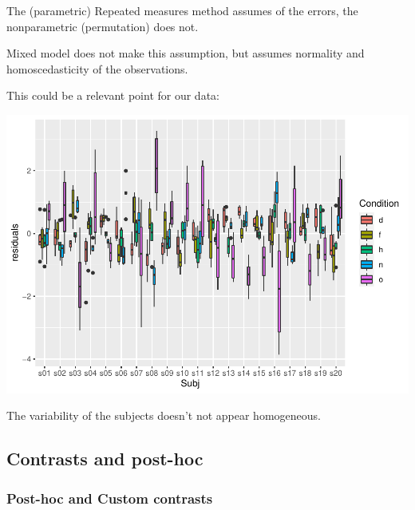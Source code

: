 \documentclass[
]{article}
\newenvironment{Shaded}{\begin{snugshade}}{\end{snugshade}}
\newcommand{\AttributeTok}[1]{\textcolor[rgb]{0.77,0.63,0.00}{#1}}
\newcommand{\FunctionTok}[1]{\textcolor[rgb]{0.00,0.00,0.00}{#1}}
\newcommand{\NormalTok}[1]{#1}
\newcommand{\OtherTok}[1]{\textcolor[rgb]{0.56,0.35,0.01}{#1}}
\newcommand{\SpecialCharTok}[1]{\textcolor[rgb]{0.00,0.00,0.00}{#1}}
\begin{document}
The (parametric) Repeated measures method assumes of the errors, the
nonparametric (permutation) does not.

Mixed model does not make this assumption, but assumes normality and
homoscedasticity of the observations.

This could be a relevant point for our data:

\begin{Shaded}
\end{Shaded}

\includegraphics{perm_repeated_measures_files/figure-latex/unnamed-chunk-12-1.pdf}

The variability of the subjects doesn't not appear homogeneous.

\hypertarget{contrasts-and-post-hoc}{%
\subsection{Contrasts and post-hoc}\label{contrasts-and-post-hoc}}

\hypertarget{post-hoc-and-custom-contrasts}{%
\subsubsection{Post-hoc and Custom
contrasts}\label{post-hoc-and-custom-contrasts}}
\end{document}
